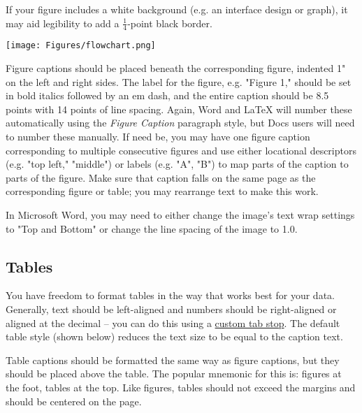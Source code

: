 \documentclass[
	letterpaper, %
]{jdf}
\begin{document}
If your figure includes a white background (e.g. an interface design or graph), it may aid legibility to add a \(\frac{1}{4}\)-point black border.

\begin{jdffigure}
\texttt{[image: Figures/flowchart.png]}%
\label{fig:flowchart}%
\end{jdffigure}

Figure captions should be placed beneath the corresponding figure, indented 1" on the left and right sides. The label for the figure, e.g. "Figure 1," should 
be set in bold italics followed by an em dash, and the entire caption should be 8.5 points with 14 points of line spacing. Again, Word and LaTeX will number 
these automatically using the \emph{Figure Caption} paragraph style, but Docs users will need to number these manually. If need be, you may have one figure caption 
corresponding to multiple consecutive figures and use either locational descriptors (e.g. "top left," "middle") or labels (e.g. "A", "B") to map parts of the caption 
to parts of the figure. Make sure that caption falls on the same page as the corresponding figure or table; you may rearrange text to make this work.

In Microsoft Word, you may need to either change the image’s text wrap settings to "Top and Bottom" or change the line spacing of the image to 1.0.

\subsection{Tables}
You have freedom to format tables in the way that works best for your data. Generally, text should be left-aligned and numbers should be right-aligned or aligned 
at the decimal – you can do this using a \href{https://practicaltypography.com/tabs-and-tab-stops.html}{custom tab stop}. The default table style (shown below) 
reduces the text size to be equal to the caption text.

Table captions should be formatted the same way as figure captions, but they should be placed above the table. The popular mnemonic for this is: figures at the 
foot, tables at the top. Like figures, tables should not exceed the margins and should be centered on the page.
\end{document}
